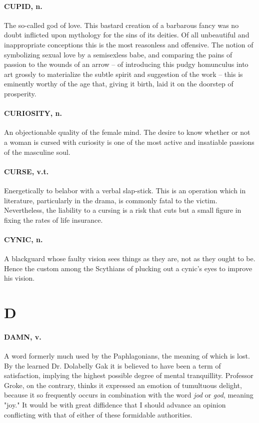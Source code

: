 \documentclass[11pt]{article}
\begin{document}
\paragraph{CUPID, n.}  The so-called god of love.  This bastard creation of a
barbarous fancy was no doubt inflicted upon mythology for the sins of
its deities.  Of all unbeautiful and inappropriate conceptions this is
the most reasonless and offensive.  The notion of symbolizing sexual
love by a semisexless babe, and comparing the pains of passion to the
wounds of an arrow -- of introducing this pudgy homunculus into art
grossly to materialize the subtle spirit and suggestion of the work --
this is eminently worthy of the age that, giving it birth, laid it on
the doorstep of prosperity.

\paragraph{CURIOSITY, n.}  An objectionable quality of the female mind.  The
desire to know whether or not a woman is cursed with curiosity is one
of the most active and insatiable passions of the masculine soul.

\paragraph{CURSE, v.t.}  Energetically to belabor with a verbal slap-stick.  This
is an operation which in literature, particularly in the drama, is
commonly fatal to the victim.  Nevertheless, the liability to a
cursing is a risk that cuts but a small figure in fixing the rates of
life insurance.

\paragraph{CYNIC, n.}  A blackguard whose faulty vision sees things as they are,
not as they ought to be.  Hence the custom among the Scythians of
plucking out a cynic's eyes to improve his vision.



\section*{D}



\paragraph{DAMN, v.}  A word formerly much used by the Paphlagonians, the meaning
of which is lost.  By the learned Dr. Dolabelly Gak it is believed to
have been a term of satisfaction, implying the highest possible degree
of mental tranquillity.  Professor Groke, on the contrary, thinks it
expressed an emotion of tumultuous delight, because it so frequently
occurs in combination with the word {\em jod} or {\em god}, meaning "joy."  It
would be with great diffidence that I should advance an opinion
conflicting with that of either of these formidable authorities.
\end{document}
